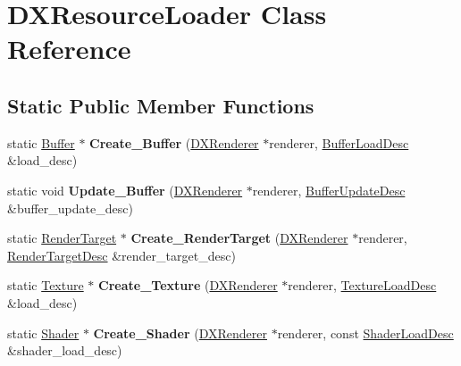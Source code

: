 \hypertarget{classDXResourceLoader}{}\section{D\+X\+Resource\+Loader Class Reference}
\label{classDXResourceLoader}
\subsection*{Static Public Member Functions}
\begin{DoxyCompactItemize}
\item 
\mbox{\label{classDXResourceLoader_a771cd595ba597d3e048e5d7120d1c0ef}} 
static \hyperlink{classBuffer}{Buffer} $\ast$ {\bfseries Create\+\_\+\+Buffer} (\hyperlink{classDXRenderer}{D\+X\+Renderer} $\ast$renderer, \hyperlink{structBufferLoadDesc}{Buffer\+Load\+Desc} \&load\+\_\+desc)
\item 
\mbox{\label{classDXResourceLoader_a2ff7bd4c1bafec9f9be8d245e11a9b5a}} 
static void {\bfseries Update\+\_\+\+Buffer} (\hyperlink{classDXRenderer}{D\+X\+Renderer} $\ast$renderer, \hyperlink{structBufferUpdateDesc}{Buffer\+Update\+Desc} \&buffer\+\_\+update\+\_\+desc)
\item 
\mbox{\label{classDXResourceLoader_ae0466f57fe0391dd008e6810a27abf3e}} 
static \hyperlink{classRenderTarget}{Render\+Target} $\ast$ {\bfseries Create\+\_\+\+Render\+Target} (\hyperlink{classDXRenderer}{D\+X\+Renderer} $\ast$renderer, \hyperlink{structRenderTargetDesc}{Render\+Target\+Desc} \&render\+\_\+target\+\_\+desc)
\item 
\mbox{\label{classDXResourceLoader_a8c8513cb2314e5d67aa60ef0d8c0d039}} 
static \hyperlink{classTexture}{Texture} $\ast$ {\bfseries Create\+\_\+\+Texture} (\hyperlink{classDXRenderer}{D\+X\+Renderer} $\ast$renderer, \hyperlink{structTextureLoadDesc}{Texture\+Load\+Desc} \&load\+\_\+desc)
\item 
\mbox{\label{classDXResourceLoader_afc2a341f6271142b090fe1b51502882c}} 
static \hyperlink{classShader}{Shader} $\ast$ {\bfseries Create\+\_\+\+Shader} (\hyperlink{classDXRenderer}{D\+X\+Renderer} $\ast$renderer, const \hyperlink{structShaderLoadDesc}{Shader\+Load\+Desc} \&shader\+\_\+load\+\_\+desc)

\end{DoxyCompactItemize}
